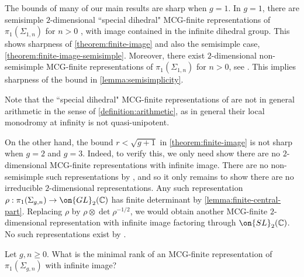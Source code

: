 \begin{remark}
\notready
	\label{remark:sharp-g-1}
	The bounds of many of our main results are sharp when $g=1$.
In $g = 1$, there are semisimple $2$-dimensional ``special dihedral" MCG-finite representations
of $\pi_1(\Sigma_{1,n})$ for $n > 0$
\cite[Theorem B]{biswas2017surface},
with image contained in the infinite dihedral group.
This shows sharpness of \autoref{theorem:finite-image} and also the semisimple
case, \autoref{theorem:finite-image-semisimple}.
Moreover, there exist $2$-dimensional non-semisimple MCG-finite representations of $\pi_1(\Sigma_{1,n})$ for $n>0$, see \cite[Theorem B]{CH:isomonodromic}.
This implies sharpness of the bound in \autoref{lemma:semisimplicity}.

Note that the ``special dihedral" MCG-finite representations of \cite[Theorem B]{biswas2017surface} are not in general arithmetic in the sense of \autoref{definition:arithmetic}, as in general their local monodromy at infinity is not quasi-unipotent.
\end{remark}
\begin{remark}
\notready
	\label{remark:not-sharp-g-2-3}
	On the other hand, the bound $r < \sqrt{g+1}$ in \autoref{theorem:finite-image} is not sharp when $g =
	2$ and $g =3$.
	Indeed, to verify this, we only need show there are no $2$-dimensional
	MCG-finite representations with infinite image. There are no non-semisimple such
	representations by \cite[Theorem B]{CH:isomonodromic}, and so it only
	remains to show there are no irreducible $2$-dimensional
	representations.
	Any such representation $\rho: \pi_1(\Sigma_{g,n}) \to \on{GL}_2(\mathbb
	C)$ has finite determinant by \autoref{lemma:finite-central-part}.
	Replacing $\rho$ by $\rho \otimes \det \rho^{-1/2}$, we would obtain another
	MCG-finite $2$-dimensional representation with infinite image factoring
	through $\on{SL}_2(\mathbb C)$.
	No such representations	exist by \cite[Theorem A]{biswas2017surface}.
\end{remark}


\begin{question}
\notready
Let $g, n\geq 0$. What is the minimal rank of an MCG-finite representation of $\pi_1(\Sigma_{g,n})$ with infinite image?
\end{question}

